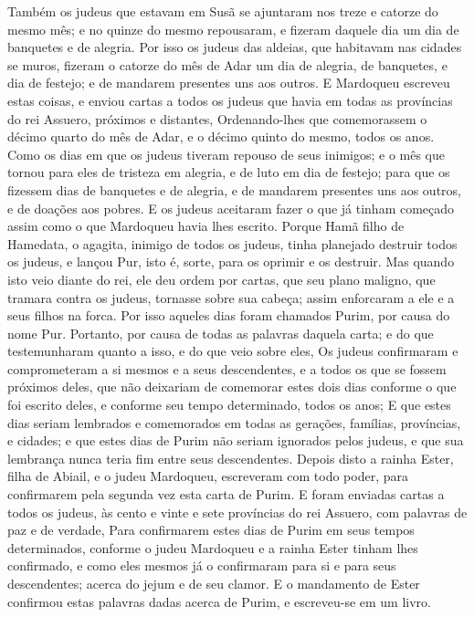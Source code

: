 {Também os judeus que estavam em Susã se ajuntaram nos
{} treze e catorze do mesmo mês; e no
{} quinze do mesmo repousaram, e fizeram daquele dia um dia de banquetes e de alegria.
Por isso os judeus das aldeias, que habitavam nas cidades se muros, fizeram o
{} catorze do mês de Adar um dia de alegria, de banquetes, e dia de festejo; e de mandarem presentes uns aos outros.
E Mardoqueu escreveu estas coisas, e enviou cartas a todos os judeus que havia em todas as províncias do rei Assuero, próximos e distantes,
Ordenando-lhes que comemorassem o décimo quarto
{} do mês de Adar, e o décimo quinto do mesmo, todos os anos.
Como os dias em que os judeus tiveram repouso de seus inimigos; e o mês que tornou para eles de tristeza em alegria, e de luto em dia de festejo; para que os fizessem dias de banquetes e de alegria, e de mandarem presentes uns aos outros, e de doações aos pobres.
E os judeus aceitaram fazer o que já tinham começado assim como o que Mardoqueu havia lhes escrito.
Porque Hamã filho de Hamedata, o agagita, inimigo de todos os judeus, tinha planejado destruir todos os judeus, e lançou Pur, isto é, sorte, para os oprimir e os destruir.
Mas quando isto veio diante do rei, ele deu ordem por cartas, que seu plano maligno, que tramara contra os judeus, tornasse sobre sua cabeça; assim enforcaram a ele e a seus filhos na forca.
Por isso aqueles dias foram chamados Purim, por causa do nome Pur. Portanto, por causa de todas as palavras daquela carta; e do que testemunharam quanto a isso, e do que veio sobre eles,
Os judeus confirmaram e comprometeram a si mesmos e a seus descendentes, e a todos os que se fossem próximos deles, que não deixariam de comemorar estes dois dias conforme o que foi escrito deles, e conforme seu tempo determinado, todos os anos;
E que estes dias seriam lembrados e comemorados em todas as gerações, famílias, províncias, e cidades; e que estes dias de Purim não seriam ignorados pelos judeus, e que sua lembrança nunca teria fim entre seus descendentes.
Depois disto a rainha Ester, filha de Abiail, e o judeu Mardoqueu, escreveram com todo poder, para confirmarem pela segunda vez esta carta de Purim.
E foram enviadas cartas a todos os judeus, às cento e vinte e sete províncias do rei Assuero, com palavras de paz e de verdade,
Para confirmarem estes dias de Purim em seus tempos determinados, conforme o judeu Mardoqueu e a rainha Ester tinham lhes confirmado, e como eles mesmos já o confirmaram para si e para seus descendentes; acerca do jejum e de seu clamor.
E o mandamento de Ester confirmou estas palavras dadas acerca de Purim, e escreveu-se em um livro.

}

